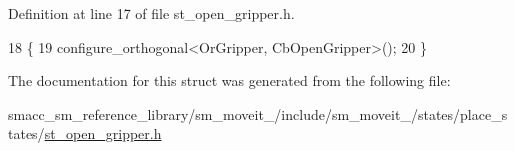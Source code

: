 Definition at line 17 of file st\+\_\+open\+\_\+gripper.\+h.


\begin{DoxyCode}
18             \{
19                 configure\_orthogonal<OrGripper, CbOpenGripper>();
20             \}
\end{DoxyCode}


The documentation for this struct was generated from the following file\+:\begin{DoxyCompactItemize}
\item 
smacc\+\_\+sm\+\_\+reference\+\_\+library/sm\+\_\+moveit\+\_/include/sm\+\_\+moveit\+\_/states/place\+\_\+states/\hyperlink{4_2include_2sm__moveit__4_2states_2place__states_2st__open__gripper_8h}{st\+\_\+open\+\_\+gripper.\+h}\end{DoxyCompactItemize}
